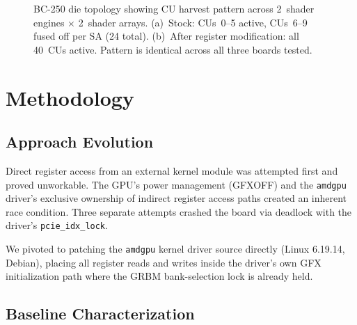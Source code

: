\documentclass[11pt,twocolumn]{article}
\begin{document}
\begin{figure}[t]
\caption{BC-250 die topology showing CU harvest pattern across 2~shader engines $\times$ 2~shader arrays. (a)~Stock: CUs~0--5 active, CUs~6--9 fused off per SA (24 total). (b)~After register modification: all 40~CUs active. Pattern is identical across all three boards tested.}
\label{fig:die}
\end{figure}

\section{Methodology}

\subsection{Approach Evolution}

Direct register access from an external kernel module was attempted first and proved unworkable. The GPU's power management (GFXOFF) and the \texttt{amdgpu} driver's exclusive ownership of indirect register access paths created an inherent race condition. Three separate attempts crashed the board via deadlock with the driver's \texttt{pcie\_idx\_lock}.

We pivoted to patching the \texttt{amdgpu} kernel driver source directly (Linux 6.19.14, Debian), placing all register reads and writes inside the driver's own GFX initialization path where the GRBM bank-selection lock is already held.

\subsection{Baseline Characterization}
\end{document}
